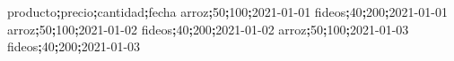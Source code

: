 \documentclass[
  letterpaper,
  DIV=11,
  numbers=noendperiod]{scrreprt}
\newenvironment{Shaded}{\begin{snugshade}}{\end{snugshade}}
\newcommand{\ExtensionTok}[1]{\textcolor[rgb]{0.00,0.23,0.31}{#1}}
\newcommand{\KeywordTok}[1]{\textcolor[rgb]{0.00,0.23,0.31}{\textbf{#1}}}
\begin{document}
\begin{enumerate}
\begin{Shaded}
\begin{Highlighting}[]
\ExtensionTok{producto}\KeywordTok{;}\ExtensionTok{precio}\KeywordTok{;}\ExtensionTok{cantidad}\KeywordTok{;}\ExtensionTok{fecha}
\ExtensionTok{arroz}\KeywordTok{;}\ExtensionTok{50}\KeywordTok{;}\ExtensionTok{100}\KeywordTok{;}\ExtensionTok{2021{-}01{-}01}
\ExtensionTok{fideos}\KeywordTok{;}\ExtensionTok{40}\KeywordTok{;}\ExtensionTok{200}\KeywordTok{;}\ExtensionTok{2021{-}01{-}01}
\ExtensionTok{arroz}\KeywordTok{;}\ExtensionTok{50}\KeywordTok{;}\ExtensionTok{100}\KeywordTok{;}\ExtensionTok{2021{-}01{-}02}
\ExtensionTok{fideos}\KeywordTok{;}\ExtensionTok{40}\KeywordTok{;}\ExtensionTok{200}\KeywordTok{;}\ExtensionTok{2021{-}01{-}02}
\ExtensionTok{arroz}\KeywordTok{;}\ExtensionTok{50}\KeywordTok{;}\ExtensionTok{100}\KeywordTok{;}\ExtensionTok{2021{-}01{-}03}
\ExtensionTok{fideos}\KeywordTok{;}\ExtensionTok{40}\KeywordTok{;}\ExtensionTok{200}\KeywordTok{;}\ExtensionTok{2021{-}01{-}03}
\end{Highlighting}
\end{Shaded}


\end{enumerate}
\end{document}
